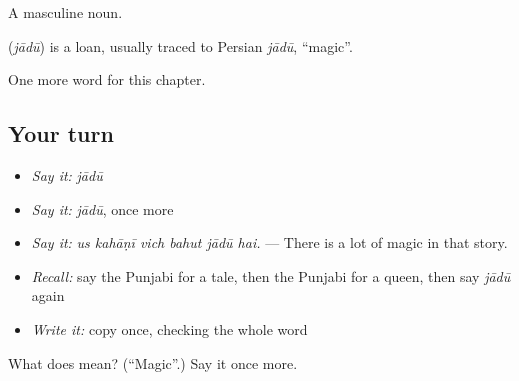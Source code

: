 A masculine noun.

\begin{cousinweb}
\textbf{} (\emph{jādū}) is a loan, usually traced to Persian \emph{jādū}, \textquotedblleft{}magic\textquotedblright{}.
\end{cousinweb}

\begin{grammarlens}[title={What you've built}]
One more word for this chapter.
\end{grammarlens}

\subsection*{Your turn}
\begin{itemize}
\raggedright
  \item \emph{Say it:} \emph{jādū}
  \item \emph{Say it:} \emph{jādū}, once more
  \item \emph{Say it:} \emph{us kahāṇī vich bahut jādū hai.} — There is a lot of magic in that story.
  \item \emph{Recall:} say the Punjabi for a tale, then the Punjabi for a queen, then say \emph{jādū} again
  \item \emph{Write it:} copy \textbf{} once, checking the whole word
\end{itemize}

\begin{tcolorbox}[breakable,colback=teal!4,colframe=teal!35!black,title={Before you move on}]
What does  mean? (\textquotedblleft{}Magic\textquotedblright{}.) Say it once more.
\end{tcolorbox}
